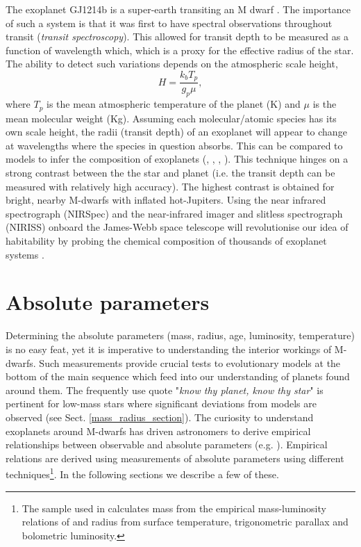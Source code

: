 The exoplanet GJ1214b is a super-earth transiting an M dwarf \citep{2009Natur.462..891C}. The importance of such a system is that it was first to have spectral observations throughout transit (\textit{transit spectroscopy}). This allowed for transit depth to be measured as a function of wavelength which, which is a proxy for the effective radius of the star. The ability to detect such variations depends on the atmospheric scale height,
%
\begin{equation}\label{scale_height}
    H = \frac{k_b T_p}{g_p\mu},
\end{equation}
%
where $T_p$ is the mean atmospheric temperature of the planet (K) and $\mu$ is the mean molecular weight (Kg). Assuming each molecular/atomic species has its own scale height, the radii (transit depth) of an exoplanet will appear to change at wavelengths where the species in question absorbs. This can be compared to models to infer the composition of exoplanets  (\citealt{2012ApJ...747...35B}, \citealt{2011A&A...526A..12D}, \citealt{2013ApJ...765..127F},  \citealt{2014Natur.505...69K}).  This technique hinges on a strong contrast between the the star and planet (i.e. the transit depth can be measured with relatively high accuracy). The highest contrast is obtained for bright, nearby M-dwarfs with inflated hot-Jupiters. Using the near infrared spectrograph (NIRSpec) and the near-infrared imager and slitless spectrograph (NIRISS) onboard the James-Webb space telescope will revolutionise our idea of habitability by probing the chemical composition of thousands of exoplanet systems \citep{2017A&A...600A..10M}. 


\section{Absolute parameters}

Determining the absolute parameters (mass, radius, age, luminosity, temperature) is no easy feat, yet it is imperative to understanding the interior workings of M-dwarfs. Such measurements provide crucial tests to evolutionary models at the bottom of the main sequence which feed into our understanding of planets found around them. The frequently use quote "\textit{know thy planet, know thy star}" is pertinent for low-mass stars where significant deviations from models are observed (see Sect. \ref{mass_radius_section}). The curiosity to understand exoplanets around M-dwarfs has driven astronomers to derive empirical relationships between observable and absolute parameters (e.g. \citealt{2015ApJ...804...64M}). Empirical relations are derived using measurements of absolute parameters using different techniques\footnote{The sample used in \citet{2015ApJ...804...64M} calculates mass from the empirical mass-luminosity relations of \citet{2000A&A...364..217D} and radius from surface temperature, trigonometric parallax and bolometric luminosity.}. In the following sections we describe a few of these. 

